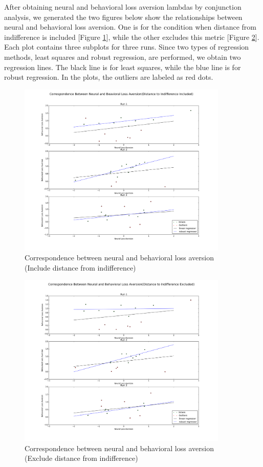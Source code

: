 \par \indent After obtaining neural and behavioral loss aversion lambdas by
conjunction analysis, we generated the two figures below show the relationships
between neural and behavioral loss aversion. One is for the condition when
distance from indifference is included [Figure \ref{fig:cor1}], while the other 
excludes this metric [Figure \ref{fig:cor2}]. Each plot 
contains three subplots for three runs. Since two types of regression methods, 
least squares and robust regression, are performed, we obtain two
regression lines. The black line is for least squares, while the blue line is for robust regression. In the plots, the outliers are labeled as red dots. 

\begin{figure}[h!]
\centering
\includegraphics[width=100mm]{images/correlation_dist2indiff.png}               
\caption{Correspondence between neural and behavioral loss aversion (Include
distance from indifference)}
\label{fig:cor1}
\end{figure}

\begin{figure}[h!]
\centering
\includegraphics[width=100mm]{images/correlation_no_dist2indiff.png}               
\caption{Correspondence between neural and behavioral loss aversion (Exclude
distance from indifference)}
\label{fig:cor2}
\end{figure}

